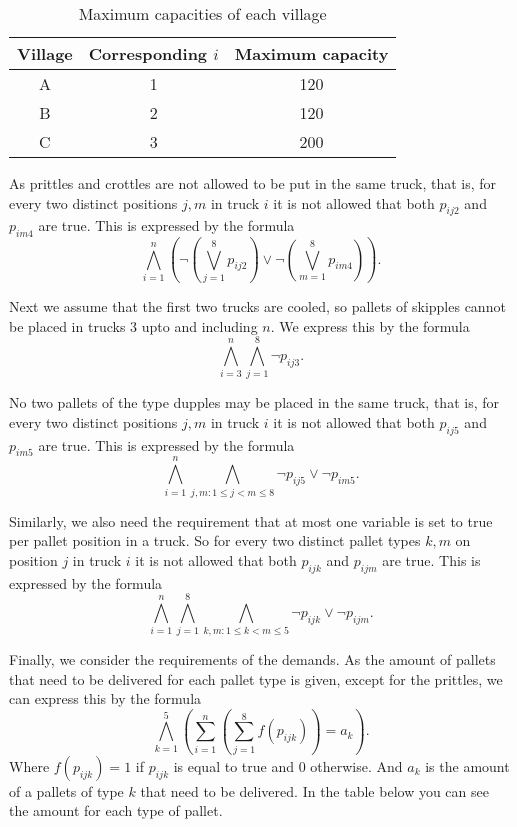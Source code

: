 \documentclass[a4paper]{article}
\begin{document}
\begin{table}[H]
\centering
\caption{Maximum capacities of each village}
\label{my-label}
\begin{tabular}{c|c|c}
\textbf{Village} & \textbf{Corresponding $i$} & \textbf{Maximum capacity} \\ \hline
A	&	1	&	120\\ \hline
B	&	2	&	120\\ \hline
C	&	3	&	200
\end{tabular}
\end{table}

	As prittles and crottles are not allowed to be put in the same truck, that is, for every two distinct positions $j,m$ in truck $i$ it is not allowed that both $p_{ij2}$ and $p_{im4}$ are true. This is expressed by the formula
\[ \bigwedge_{i=1}^n (\neg (\bigvee_{j=1}^8 p_{ij2}) \vee \neg (\bigvee_{m=1}^8 p_{im4})).\]

Next we assume that the first two trucks are cooled, so pallets of skipples cannot be placed in trucks 3 upto and including $n$. We express this by the formula
\[ \bigwedge_{i=3}^n \bigwedge_{j=1}^8 \neg p_{ij3}.\]

No two pallets of the type dupples may be placed in the same truck, that is, for every two distinct positions $j,m$ in truck $i$ it is not allowed that both $p_{ij5}$ and $p_{im5}$ are true. This is expressed by the formula
\[ \bigwedge_{i=1}^n \bigwedge_{j,m:1 \leq j < m \leq 8} \neg p_{ij5} \vee \neg p_{im5}.\]

Similarly, we also need the requirement that at most one variable is set to true per pallet position in a truck. So for every two distinct pallet types $k,m$ on position $j$ in truck $i$ it is not allowed that both $p_{ijk}$ and $p_{ijm}$ are true. This is expressed by the formula
\[ \bigwedge_{i=1}^n \bigwedge_{j=1}^8 \bigwedge_{k,m:1 \leq k < m \leq 5} \neg p_{ijk} \vee \neg p_{ijm}.\]

Finally, we consider the requirements of the demands. As the amount of pallets that need to be delivered for each pallet type is given, except for the prittles, we can express this by the formula
\[ \bigwedge_{k=1}^5 ( \sum_{i=1}^n ( \sum_{j=1}^8 f(p_{ijk}) ) = a_k).\]
Where $f(p_{ijk}) = 1$ if $p_{ijk}$ is equal to true and 0 otherwise. And $a_k$ is the amount of a pallets of type $k$ that need to be delivered. In the table below you can see the amount for each type of pallet.
\end{document}

